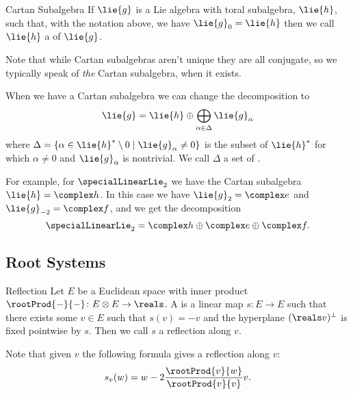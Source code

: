 \documentclass[fleqn]{NotesClass}
\begin{document}
    \begin{dfn}{Cartan Subalgebra}{}
        If \(\lie{g}\) is a Lie algebra with toral subalgebra, \(\lie{h}\), such that, with the notation above, we have \(\lie{g}_0 = \lie{h}\) then we call \(\lie{h}\) a  of \(\lie{g}\).
    \end{dfn}
    
    Note that while Cartan subalgebras aren't unique they are all conjugate, so we typically speak of \emph{the} Cartan subalgebra, when it exists.
    
    When we have a Cartan subalgebra we can change the decomposition to
    \begin{equation}
        \lie{g} = \lie{h} \oplus \bigoplus_{\alpha \in \Delta} \lie{g}_\alpha
    \end{equation}
    where \(\Delta = \{\alpha \in \lie{h}^*\setminus 0 \mid \lie{g}_\alpha \ne 0\}\) is the subset of \(\lie{h}^*\) for which \(\alpha \ne 0\) and \(\lie{g}_\alpha\) is nontrivial.
    We call \(\Delta\) a set of .
    
    For example, for \(\specialLinearLie_2\) we have the Cartan subalgebra \(\lie{h} = \complex h\).
    In this case we have \(\lie{g}_{2} = \complex e\) and \(\lie{g}_{-2} = \complex f\), and we get the decomposition
    \begin{equation}
        \specialLinearLie_2 = \complex h \oplus \complex e \oplus \complex f.
    \end{equation}
    
    \subsection{Root Systems}
    \begin{dfn}{Reflection}{}
        Let \(E\) be a Euclidean space with inner product \(\rootProd{-}{-} \colon E \otimes E \to \reals\).
        A  is a linear map \(s \colon E \to E\) such that there exists some \(v \in E\) such that \(s(v) = -v\) and the hyperplane \((\reals v)^{\perp}\) is fixed pointwise by \(s\).
        Then we call \(s\) a reflection along \(v\).
    \end{dfn}
    
    Note that given \(v\) the following formula gives a reflection along \(v\):
    \begin{equation}
        s_v(w) = w - 2\frac{\rootProd{v}{w}}{\rootProd{v}{v}} v.
    \end{equation}
    
\end{document}
